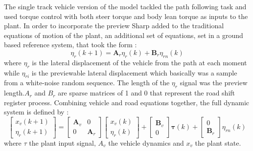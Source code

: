 The single track vehicle version of the model tackled the path following task and used torque control with both steer torque and body lean torque as  inputs to the plant. In order to incorporate the preview Sharp added to the traditional equations of motion of the plant, an additional set of equations, set in a ground based reference system, that took the form :
\begin{equation}
    \eta_{r}(k+1)=\mathbf{A}_{r} \eta_{r}(k)+\mathbf{B}_{r} \eta_{r n}(k)
\end{equation}
where \ensuremath{\eta_r} is the lateral displacement of the vehicle from the path at each moment while \ensuremath{\eta_{ri}} is the previewable lateral displacement which basically was  a sample from a white-noise random sequence. The length of the \ensuremath{\eta_r} signal was the preview length.\ensuremath{A_r} and \ensuremath{B_r} are sparse matrices of 1 and 0 that represent the road shift register process. Combining vehicle and road equations together, the full dynamic system is defined by :
\begin{equation}
    \left[ \begin{array}{c}{x_{v}(k+1)} \\ {\eta_{r}(k+1)}\end{array}\right]=\left[ \begin{array}{cc}{\mathbf{A}_{v}} & {0} \\ {0} & {\mathbf{A}_{r}}\end{array}\right] \left[ \begin{array}{c}{x_{v}(k)} \\ {\eta_{r}(k)}\end{array}\right]+\left[ \begin{array}{c}{\mathbf{B}_{v}} \\ {0}\end{array}\right] \boldsymbol{\tau}(k)+\left[ \begin{array}{c}{0} \\ {\mathbf{B}_{r}}\end{array}\right] \eta_{r n}(k)
\end{equation}
where \ensuremath{\tau} the plant input signal, \ensuremath{A_v} the vehicle dynamics and \ensuremath{x_v} the plant state.
\par

